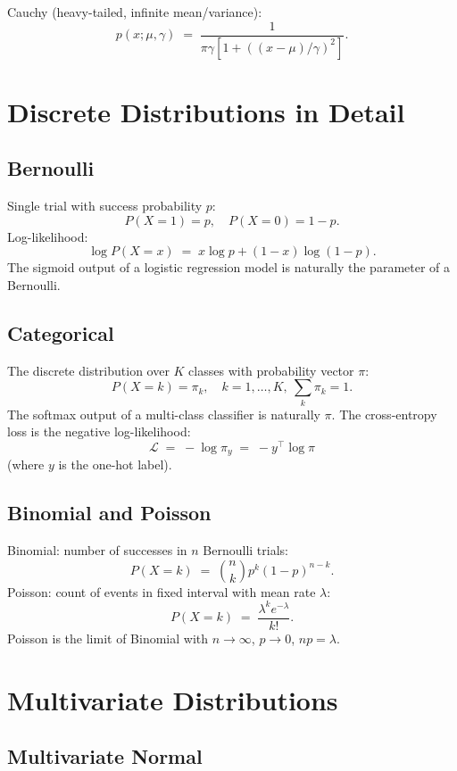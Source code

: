 Cauchy (heavy-tailed, infinite mean/variance):
\[
p(x; \mu, \gamma) \;=\; \frac{1}{\pi \gamma\left[1 + ((x - \mu)/\gamma)^2\right]}.
\]

\section{Discrete Distributions in Detail}
\label{sec:distributions:discrete_detail}

\subsection{Bernoulli}
\label{ssec:distributions:bernoulli}

Single trial with success probability $p$:
\[
P(X = 1) = p,\quad P(X = 0) = 1 - p.
\]
Log-likelihood:
\[
\log P(X = x) \;=\; x \log p + (1 - x) \log(1 - p).
\]
The sigmoid output of a logistic regression model is naturally
the parameter of a Bernoulli.

\subsection{Categorical}
\label{ssec:distributions:categorical}

The discrete distribution over $K$ classes with probability
vector $\pi$:
\[
P(X = k) = \pi_k,\quad k = 1, \ldots, K,\ \sum_k \pi_k = 1.
\]
The softmax output of a multi-class classifier is naturally
$\pi$. The cross-entropy loss is the negative log-likelihood:
\[
\mathcal{L} \;=\; -\log \pi_{y} \;=\; -y^\top \log \pi
\]
(where $y$ is the one-hot label).

\subsection{Binomial and Poisson}
\label{ssec:distributions:binomial_poisson}

Binomial: number of successes in $n$ Bernoulli trials:
\[
P(X = k) \;=\; \binom{n}{k} p^k (1 - p)^{n - k}.
\]
Poisson: count of events in fixed interval with mean rate
$\lambda$:
\[
P(X = k) \;=\; \frac{\lambda^k e^{-\lambda}}{k!}.
\]
Poisson is the limit of Binomial with $n \to \infty$, $p \to 0$,
$np = \lambda$.

\section{Multivariate Distributions}
\label{sec:distributions:multivariate}

\subsection{Multivariate Normal}
\label{ssec:distributions:mvn}

